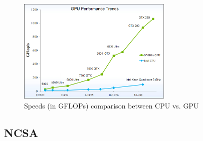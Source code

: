 \begin{figure}[hbt]
  \centerline{\includegraphics[height=5cm,
    angle=0]{./images/GPUvsCPU.eps}}
\caption{Speeds (in GFLOPs) comparison between CPU vs. GPU}
\label{fig:GPUvsCPU}
\end{figure}


\subsection{NCSA}
\label{sec:NCSA}

